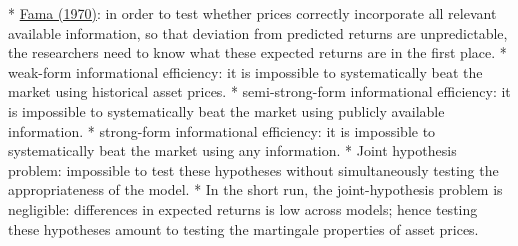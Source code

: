\begin{exmpl}

	* 	\href{http://onlinelibrary.wiley.com/doi/10.1111/j.1540-6261.1970.tb00518.x/full}{Fama (1970)}: in order to test whether prices correctly incorporate all relevant available information, so that deviation from predicted returns are unpredictable, the researchers need to know what these expected returns are in the first place.
	* {\color{blue} weak-form informational efficiency}: it is impossible to systematically beat the market using historical asset prices.
	* {\color{blue} semi-strong-form informational efficiency}: it is impossible to systematically beat the market using publicly available information.
	* {\color{blue} strong-form informational efficiency}: it is impossible to systematically beat the market using any information.
	* Joint hypothesis problem: impossible to test these hypotheses without simultaneously testing the appropriateness of the model.
	* In the short run, the joint-hypothesis problem is negligible: differences in expected returns is low across models; hence testing these hypotheses amount to testing the martingale properties of asset prices.

\end{exmpl}





